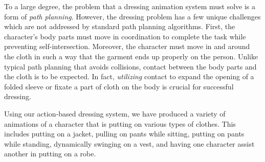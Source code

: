 To a large degree, the problem that a dressing animation system must solve
is a form of \emph{path planning}.  However, the dressing problem has a
few unique challenges which are not addressed by standard path planning
algorithms. First, the character's body parts must move in coordination to
complete the task while preventing self-intersection. Moreover, the
character must move in and around the cloth in such a way that the garment
ends up properly on the person. Unlike typical path planning that avoids
collisions, contact between the body parts and the cloth is to be
expected. In fact, \emph{utilizing} contact to expand the opening of a folded
sleeve or fixate a part of cloth on the body is crucial for
successful dressing.


Using our action-based dressing system, we have produced a variety of
animations of a character that is putting on various types of clothes.
This includes putting on a jacket, pulling on pants while sitting, putting
on pants while standing, dynamically swinging on a vest, and having one character assist another in putting on a robe.


